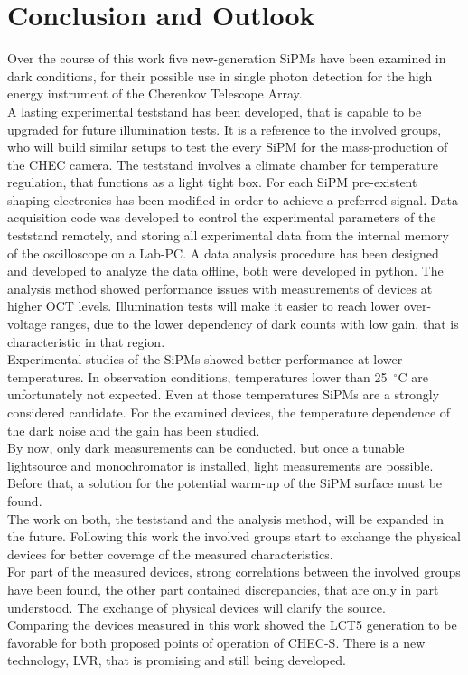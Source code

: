 \documentclass[12pt,article,type=msc,colorback,accentcolor=tud9c]{tudthesis}
\begin{document}
\section{\Large Conclusion and Outlook}

Over the course of this work five new-generation SiPMs have been examined in dark conditions, for their possible use in single photon detection for the high energy instrument of the Cherenkov Telescope Array.\\
A lasting experimental teststand has been developed, that is capable to be upgraded for future illumination tests. It is a reference to the involved groups, who will build similar setups to test the every SiPM for the mass-production of the CHEC camera. The teststand involves a climate chamber for temperature regulation, that functions as a light tight box. For each SiPM pre-existent shaping electronics has been modified in order to achieve a preferred signal. Data acquisition code was developed to control the experimental parameters of the teststand remotely, and storing all experimental data from the internal memory of the oscilloscope on a Lab-PC. A data analysis procedure has been designed and developed to analyze the data offline, both were developed in python. The analysis method showed performance issues with measurements of devices at higher OCT levels. Illumination tests will make it easier to reach lower over-voltage ranges, due to the lower dependency of dark counts with low gain, that is characteristic in that region.\\
Experimental studies of the SiPMs showed better performance at lower temperatures. In observation conditions, temperatures lower than 25~$^\circ$C are unfortunately not expected. Even at those temperatures SiPMs are a strongly considered candidate. For the examined devices, the temperature dependence of the dark noise and the gain has been studied.\\
By now, only dark measurements can be conducted, but once a tunable lightsource and monochromator is installed, light measurements are possible. Before that, a solution for the potential warm-up of the SiPM surface must be found.\\
The work on both, the teststand and the analysis method, will be expanded in the future. Following this work the involved groups start to exchange the physical devices for better coverage of the measured characteristics.\\
For part of the measured devices, strong correlations between the involved groups have been found, the other part contained discrepancies, that are only in part understood. The exchange of physical devices will clarify the source.\\
Comparing the devices measured in this work showed the LCT5 generation to be favorable for both proposed points of operation of CHEC-S. There is a new technology, LVR, that is promising and still being developed.
\end{document}
